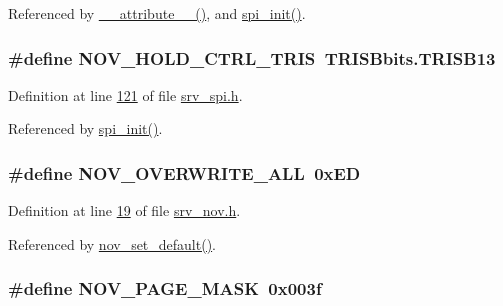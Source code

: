 Referenced by \hyperlink{a00041_source_l00025}{\+\_\+\+\_\+attribute\+\_\+\+\_\+()}, and \hyperlink{a00032_source_l00030}{spi\+\_\+init()}.

\hypertarget{a00029_a37dc9980ee3379d4bd3a66f7cf9d761e}{
\subsubsection[{N\+O\+V\+\_\+\+H\+O\+L\+D\+\_\+\+C\+T\+R\+L\+\_\+\+T\+R\+I\+S}]{\setlength{\rightskip}{0pt plus 5cm}\#define N\+O\+V\+\_\+\+H\+O\+L\+D\+\_\+\+C\+T\+R\+L\+\_\+\+T\+R\+I\+S~T\+R\+I\+S\+Bbits.\+T\+R\+I\+S\+B13}}\label{a00029_a37dc9980ee3379d4bd3a66f7cf9d761e}


Definition at line \hyperlink{a00013_source_l00121}{121} of file \hyperlink{a00013_source}{srv\+\_\+spi.\+h}.



Referenced by \hyperlink{a00032_source_l00030}{spi\+\_\+init()}.

\hypertarget{a00029_aa3471d8e4814035dc24211c0890899bb}{
\subsubsection[{N\+O\+V\+\_\+\+O\+V\+E\+R\+W\+R\+I\+T\+E\+\_\+\+A\+L\+L}]{\setlength{\rightskip}{0pt plus 5cm}\#define N\+O\+V\+\_\+\+O\+V\+E\+R\+W\+R\+I\+T\+E\+\_\+\+A\+L\+L~0x\+E\+D}}\label{a00029_aa3471d8e4814035dc24211c0890899bb}


Definition at line \hyperlink{a00029_source_l00019}{19} of file \hyperlink{a00029_source}{srv\+\_\+nov.\+h}.



Referenced by \hyperlink{a00060_source_l00760}{nov\+\_\+set\+\_\+default()}.

\hypertarget{a00029_a9eddef3795715df4279af5e0ddd92a87}{
\subsubsection[{N\+O\+V\+\_\+\+P\+A\+G\+E\+\_\+\+M\+A\+S\+K}]{\setlength{\rightskip}{0pt plus 5cm}\#define N\+O\+V\+\_\+\+P\+A\+G\+E\+\_\+\+M\+A\+S\+K~0x003f}}\label{a00029_a9eddef3795715df4279af5e0ddd92a87}


